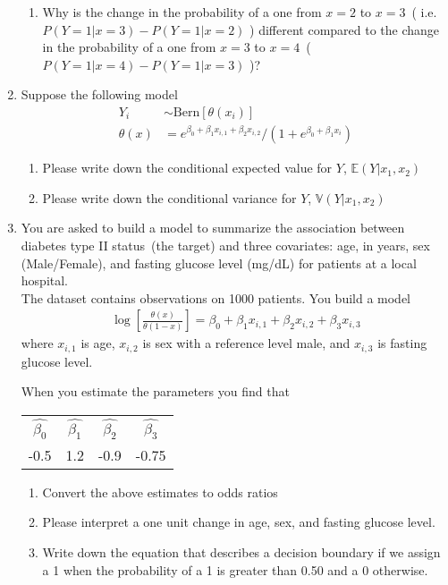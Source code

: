 \begin{enumerate}
\begin{enumerate}
            \item Why is the change in the probability of a one from $x=2$ to $x=3$~( i.e. $P(Y=1 | x=3) - P(Y=1 | x=2)$ ) different compared to the change in the probability of a one from $x=3$ to $x=4$~($P(Y=1 | x=4) - P(Y=1 | x=3)$ )?
        \end{enumerate}
    \item Suppose the following model
    \begin{align}
        Y_{i} & \sim  \text{Bern}[\theta(x_{i})] \\ 
              \theta(x) &= e^{\beta_{0} + \beta_{1}x_{i,1} +\beta_{2}x_{i,2} } \Big / (1+e^{\beta_{0} + \beta_{1}x_{i}})
        \end{align}
    \begin{enumerate}
        \item Please write down the conditional expected value for $Y$, $\mathbb{E}(Y | x_{1}, x_{2})$
        \item Please write down the conditional variance for $Y$, $\mathbb{V}(Y | x_{1}, x_{2})$
    \end{enumerate}
    
    \item You are asked to build a model to summarize the association between diabetes type II status~(the target) and three covariates: age, in years, sex (Male/Female), and fasting glucose level (mg/dL) for patients at a local hospital.\\
    
    The dataset contains observations on 1000 patients. 
    You build a model 
    \begin{align}
        \log \left[\frac{\theta(x)}{\theta(1-x)}\right] = \beta_{0} + \beta_{1} x_{i,1} + \beta_{2}x_{i,2} + \beta_{3}x_{i,3}
    \end{align}
    where $x_{i,1}$ is age, $x_{i,2}$ is sex with a reference level male, and $x_{i,3}$ is fasting glucose level.
    
    When you estimate the parameters you find that
    \begin{table}[ht!]
        \centering
        \begin{tabular}{cccc}
            $\hat{\beta_{0}}$ & $\hat{\beta_{1}}$ & $\hat{\beta_{2}}$ & $\hat{\beta_{3}}$ \\
             -0.5 & 1.2 & -0.9 & -0.75 \\
        \end{tabular}
    \end{table}
    
    \begin{enumerate}
        \item Convert the above estimates to odds ratios
        \item Please interpret a one unit change in age, sex, and fasting glucose level.
        \item Write down the equation that describes a decision boundary if we assign a 1 when the probability of a 1 is greater than 0.50 and a 0 otherwise. 
    \end{enumerate}
    
    
\end{enumerate}










